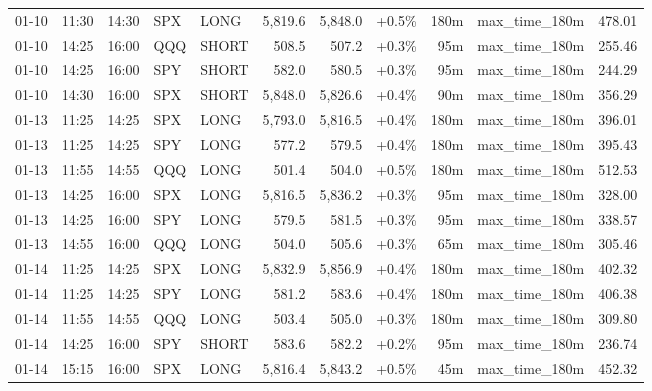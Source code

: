 \documentclass[11pt,a4paper,twoside]{article}
\begin{document}
\begin{center}
\begin{longtable}{>{\color{txtmain}}l l l l l r r r r >{\color{txtmain}}l r}
01-10 & 11:30 & 14:30 & SPX & LONG & 5,819.6 & 5,848.0 & \textcolor{wingreen}{+0.5\%} & 180m & max\_time\_180m & \textcolor{wingreen}{478.01} \\
01-10 & 14:25 & 16:00 & QQQ & SHORT & 508.5 & 507.2 & \textcolor{wingreen}{+0.3\%} & 95m & max\_time\_180m & \textcolor{wingreen}{255.46} \\
01-10 & 14:25 & 16:00 & SPY & SHORT & 582.0 & 580.5 & \textcolor{wingreen}{+0.3\%} & 95m & max\_time\_180m & \textcolor{wingreen}{244.29} \\
01-10 & 14:30 & 16:00 & SPX & SHORT & 5,848.0 & 5,826.6 & \textcolor{wingreen}{+0.4\%} & 90m & max\_time\_180m & \textcolor{wingreen}{356.29} \\
01-13 & 11:25 & 14:25 & SPX & LONG & 5,793.0 & 5,816.5 & \textcolor{wingreen}{+0.4\%} & 180m & max\_time\_180m & \textcolor{wingreen}{396.01} \\
01-13 & 11:25 & 14:25 & SPY & LONG & 577.2 & 579.5 & \textcolor{wingreen}{+0.4\%} & 180m & max\_time\_180m & \textcolor{wingreen}{395.43} \\
01-13 & 11:55 & 14:55 & QQQ & LONG & 501.4 & 504.0 & \textcolor{wingreen}{+0.5\%} & 180m & max\_time\_180m & \textcolor{wingreen}{512.53} \\
01-13 & 14:25 & 16:00 & SPX & LONG & 5,816.5 & 5,836.2 & \textcolor{wingreen}{+0.3\%} & 95m & max\_time\_180m & \textcolor{wingreen}{328.00} \\
01-13 & 14:25 & 16:00 & SPY & LONG & 579.5 & 581.5 & \textcolor{wingreen}{+0.3\%} & 95m & max\_time\_180m & \textcolor{wingreen}{338.57} \\
01-13 & 14:55 & 16:00 & QQQ & LONG & 504.0 & 505.6 & \textcolor{wingreen}{+0.3\%} & 65m & max\_time\_180m & \textcolor{wingreen}{305.46} \\
01-14 & 11:25 & 14:25 & SPX & LONG & 5,832.9 & 5,856.9 & \textcolor{wingreen}{+0.4\%} & 180m & max\_time\_180m & \textcolor{wingreen}{402.32} \\
01-14 & 11:25 & 14:25 & SPY & LONG & 581.2 & 583.6 & \textcolor{wingreen}{+0.4\%} & 180m & max\_time\_180m & \textcolor{wingreen}{406.38} \\
01-14 & 11:55 & 14:55 & QQQ & LONG & 503.4 & 505.0 & \textcolor{wingreen}{+0.3\%} & 180m & max\_time\_180m & \textcolor{wingreen}{309.80} \\
01-14 & 14:25 & 16:00 & SPY & SHORT & 583.6 & 582.2 & \textcolor{wingreen}{+0.2\%} & 95m & max\_time\_180m & \textcolor{wingreen}{236.74} \\
01-14 & 15:15 & 16:00 & SPX & LONG & 5,816.4 & 5,843.2 & \textcolor{wingreen}{+0.5\%} & 45m & max\_time\_180m & \textcolor{wingreen}{452.32} \\

\end{longtable}
\end{center}
\end{document}
